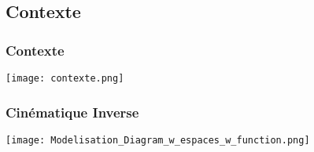 \documentclass[french]{beamer}
\begin{document}
\subsection{Contexte}

\begin{frame}
    \frametitle{Contexte}

    \center
    \texttt{[image: contexte.png]}


\end{frame}


\begin{frame}
    \frametitle{Cinématique Inverse}

    \texttt{[image: Modelisation\_Diagram\_w\_espaces\_w\_function.png]}

\end{frame}

\end{document}
